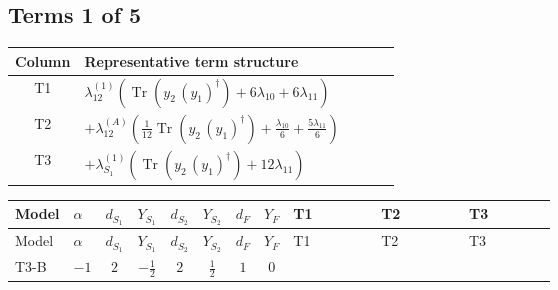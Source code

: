 \documentclass[8pt]{article}
\begin{document}
\begin{landscape}
\subsection*{Terms 1 of 5}
\begin{center}
\begin{tabular}{@{}c >{\raggedright\arraybackslash}p{0.82\linewidth}@{}}
\toprule
Column & Representative term structure \\
\midrule
T1 & \(\displaystyle {\lambda_{12}^{(1)}} (\operatorname{Tr}\!\left({y_2}\,\left({y_1}\right)^{\dagger}\right)+6 {\lambda_{10}}+6 {\lambda_{11}})\) \\
\midrule
T2 & \(\displaystyle +{\lambda_{12}^{(A)}} \left(\frac{1}{12} \operatorname{Tr}\!\left({y_2}\,\left({y_1}\right)^{\dagger}\right)+\frac{{\lambda_{10}}}{6}+\frac{5 {\lambda_{11}}}{6}\right)\) \\
\midrule
T3 & \(\displaystyle +{\lambda_{S_1}^{(1)}} (\operatorname{Tr}\!\left({y_2}\,\left({y_1}\right)^{\dagger}\right)+12 {\lambda_{11}})\) \\
\midrule
\bottomrule
\end{tabular}
\end{center}
\smallskip
\tiny
\begin{longtable}{@{}llcccccc >{\raggedright\arraybackslash}p{0.21\linewidth} >{\raggedright\arraybackslash}p{0.21\linewidth} >{\raggedright\arraybackslash}p{0.21\linewidth}@{}}
\toprule
Model & $\alpha$ & $d_{S_1}$ & $Y_{S_1}$ & $d_{S_2}$ & $Y_{S_2}$ & $d_F$ & $Y_F$ & T1 & T2 & T3 \\
\midrule
\endfirsthead
\toprule
Model & $\alpha$ & $d_{S_1}$ & $Y_{S_1}$ & $d_{S_2}$ & $Y_{S_2}$ & $d_F$ & $Y_F$ & T1 & T2 & T3 \\
\midrule
\endhead
T3-B & $-1$ & $2$ & $-\frac{1}{2}$ & $2$ & $\frac{1}{2}$ & $1$ & $0$ & \scriptsize\adjustbox{max width=\linewidth}{$\begin{gathered} {\lambda_{12}^{(1)}} (\operatorname{Tr}\!\left({y_2}\,\left({y_1}\right)^{\dagger}\right)+6 {\lambda_{10}}+6 {\lambda_{11}})\end{gathered}$} & \scriptsize\adjustbox{max width=\linewidth}{$\begin{gathered} +{\lambda_{12}^{(A)}} \left(\frac{1}{12} \operatorname{Tr}\!\left({y_2}\,\left({y_1}\right)^{\dagger}\right)+\frac{{\lambda_{10}}}{6}+\frac{5 {\lambda_{11}}}{6}\right)\end{gathered}$} & \scriptsize\adjustbox{max width=\linewidth}{$\begin{gathered} +{\lambda_{S_1}^{(1)}} (\operatorname{Tr}\!\left({y_2}\,\left({y_1}\right)^{\dagger}\right)+12 {\lambda_{11}})\end{gathered}$} \\

\end{longtable}
\end{landscape}
\end{document}
